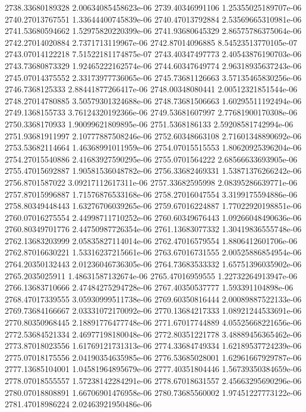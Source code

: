 {2738.33680189328 2.00634085458623e-06
2739.40346991106 1.25355025189707e-06
2740.27013767551 1.33644400745839e-06
2740.47013792884 2.53569665310981e-06
2741.53680594662 1.52975820220399e-06
2741.93680645329 2.86575786375064e-06
2742.27014020884 2.7371713119967e-06
2742.87014096885 8.54523513770105e-07
2743.07014122218 7.51522181174875e-07
2743.40347497773 2.40543876190703e-06
2743.73680873329 1.92465222162574e-06
2744.60347649774 2.96318935637243e-06
2745.07014375552 2.33173977736065e-06
2745.73681126663 3.57135465830256e-06
2746.7368125333 2.88441877266417e-06
2748.00348080441 2.00512321851544e-06
2748.27014780885 3.50579301324688e-06
2748.73681506663 1.60295511192494e-06
2749.1368155733 3.76124320192366e-06
2749.53681607997 2.77681900170308e-06
2750.3368170933 1.90099621809895e-06
2751.5368186133 2.59208581742994e-06
2751.93681911997 2.10777887508246e-06
2752.60348663108 2.71601348890692e-06
2753.53682114664 1.46368991011959e-06
2754.07015515553 1.80620925396204e-06
2754.27015540886 2.41683927590295e-06
2755.0701564222 2.68566633693905e-06
2755.47015692887 1.90581536048782e-06
2756.33682469331 1.53871376266242e-06
2756.8701587022 3.09217112617311e-06
2757.33682595998 2.08395286639771e-06
2757.87015996887 1.71576876533168e-06
2758.27016047554 3.3199175594886e-06
2758.80349448443 1.63276706039265e-06
2759.67016224887 1.77022920198851e-06
2760.07016275554 2.44998711710252e-06
2760.60349676443 1.09266048490636e-06
2760.80349701776 2.44750987726354e-06
2761.13683077332 1.30419836555748e-06
2762.13683203999 2.05835827114014e-06
2762.47016579554 1.8806412601706e-06
2762.87016630221 1.53316237215661e-06
2763.67016731555 2.00525886854954e-06
2764.20350132443 2.01236046736305e-06
2764.73683533332 1.65751396035902e-06
2765.2035025911 1.48631587132674e-06
2765.47016959555 1.22732264913947e-06
2766.13683710666 2.47484275294728e-06
2767.40350537777 1.593391104898e-06
2768.47017339555 3.05930999511738e-06
2769.60350816444 2.00089887522133e-06
2769.73684166667 2.03331072170092e-06
2770.13684217333 1.08921244533691e-06
2770.80350968445 2.18891776477748e-06
2771.67017744889 4.05525668221656e-06
2772.53684521334 2.46977198180048e-06
2772.80351221778 3.48889456365462e-06
2773.87018023556 1.61769121731313e-06
2774.33684749334 1.62189537724239e-06
2775.07018175556 2.04190354635985e-06
2776.53685028001 1.62961667929787e-06
2777.13685104001 1.04581964895679e-06
2777.40351804446 1.56739350384659e-06
2778.07018555557 1.57238142284291e-06
2778.67018631557 2.45663295690296e-06
2780.07018808891 1.66706901476958e-06
2780.73685560002 1.97451227773122e-06
2781.47018986224 2.02463921950486e-06
}

